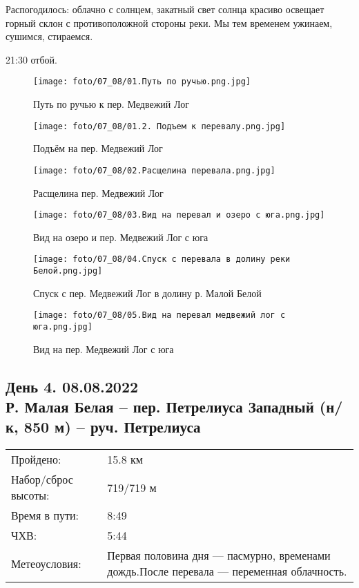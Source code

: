 Распогодилось: облачно с солнцем, закатный свет солнца красиво освещает горный склон с противоположной стороны реки.
Мы тем временем ужинаем, сушимся, стираемся.

21:30 отбой.

\begin{figure}
    \centering
    \texttt{[image: foto/07\_08/01.Путь по ручью.png.jpg]}
    \caption{Путь по ручью к пер. Медвежий Лог}
    \label{fig3:1}
\end{figure}

\begin{figure}
    \centering
    \texttt{[image: foto/07\_08/01.2. Подъем к перевалу.png.jpg]}
    \caption{Подъём на пер. Медвежий Лог}
    \label{fig3:2}
\end{figure}

\begin{figure}
    \centering
    \texttt{[image: foto/07\_08/02.Расщелина перевала.png.jpg]}
    \caption{Расщелина пер. Медвежий Лог}
    \label{fig3:3}
\end{figure}

\begin{figure}
    \centering
    \texttt{[image: foto/07\_08/03.Вид на перевал и озеро с юга.png.jpg]}
    \caption{Вид на озеро и пер. Медвежий Лог с юга}
    \label{fig3:4}
\end{figure}

\begin{figure}
    \centering
    \texttt{[image: foto/07\_08/04.Спуск с перевала в долину реки Белой.png.jpg]}
    \caption{Спуск с пер. Медвежий Лог в долину р. Малой Белой}
    \label{fig3:5}
\end{figure}

\begin{figure}
    \centering
    \texttt{[image: foto/07\_08/05.Вид на перевал медвежий лог с юга.png.jpg]}
    \caption{Вид на пер. Медвежий Лог с юга}
    \label{fig3:6}
\end{figure}

\FloatBarrier

\subsection{День 4. 08.08.2022\\
Р. Малая Белая -- пер. Петрелиуса Западный (н/к, 850 м) -- руч. Петрелиуса}
\begin{tabular}{l p{12cm}}
\hline
Пройдено: & 15.8 км\\
Набор/сброс высоты: & 719/719 м\\
Время в пути: & 8:49\\
ЧХВ: & 5:44\\
Метеоусловия: & Первая половина дня --- пасмурно, временами дождь.\hfill \break После перевала --- переменная облачность.\\
\hline
\end{tabular}\\

